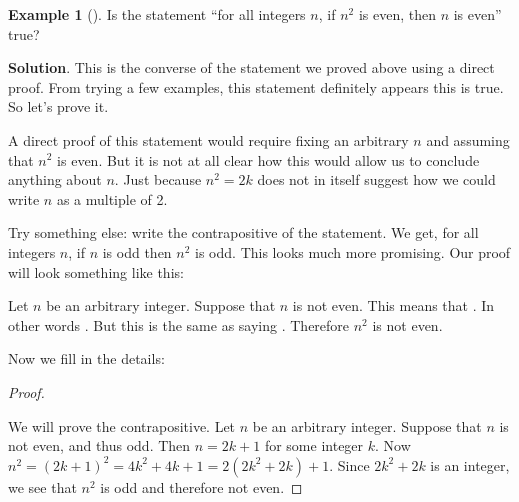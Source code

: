 \documentclass[10pt,]{book}
\theoremstyle{plain}
\theoremstyle{definition}
\theoremstyle{definition}
\newtheorem{example}[theorem]{Example}
\theoremstyle{definition}
\theoremstyle{definition}
\numberwithin{equation}{chapter}
\begin{document}
\begin{example}[]\label{example-66}
\hypertarget{p-1950}{}%
Is the statement ``for all integers \(n\), if \(n^2\) is even, then \(n\) is even'' true?%
\par\smallskip%
\noindent\textbf{Solution}.\hypertarget{solution-181}{}\quad%
\hypertarget{p-1951}{}%
This is the converse of the statement we proved above using a direct proof. From trying a few examples, this statement definitely appears this is true. So let's prove it.%
\par
\hypertarget{p-1952}{}%
A direct proof of this statement would require fixing an arbitrary \(n\) and assuming that \(n^2\) is even. But it is not at all clear how this would allow us to conclude anything about \(n\). Just because \(n^2 = 2k\) does not in itself suggest how we could write \(n\) as a multiple of 2.%
\par
\hypertarget{p-1953}{}%
Try something else: write the contrapositive of the statement. We get, for all integers \(n\), if \(n\) is odd then \(n^2\) is odd. This looks much more promising. Our proof will look something like this:%
\par
\hypertarget{p-1954}{}%
Let \(n\) be an arbitrary integer. Suppose that \(n\) is not even. This means that \textellipsis{}. In other words \textellipsis{}. But this is the same as saying \textellipsis{}. Therefore \(n^2\) is not even.%
\par
\hypertarget{p-1955}{}%
Now we fill in the details:%
\begin{proof}\hypertarget{proof-23}{}
\hypertarget{p-1956}{}%
We will prove the contrapositive. Let \(n\) be an arbitrary integer. Suppose that \(n\) is not even, and thus odd. Then \(n= 2k+1\) for some integer \(k\). Now \(n^2 = (2k+1)^2 = 4k^2 + 4k + 1 = 2(2k^2 + 2k) + 1\). Since \(2k^2 + 2k\) is an integer, we see that \(n^2\) is odd and therefore not even.%
\end{proof}
\end{example}
\end{document}
